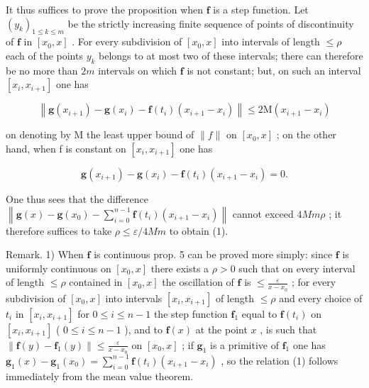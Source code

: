 It thus suffices to prove the proposition when \(\mathbf{f}\) is a step function. Let \((y_{k})_{1\leqslant k\leqslant m}\) be the strictly increasing finite sequence of points of discontinuity of \(\mathbf{f}\) in \([x_0, x]\) . For every subdivision of \([x_0, x]\) into intervals of length \(\leqslant \rho\) each of the points \(y_{k}\) belongs to at most two of these intervals; there can therefore be no more than \(2m\) intervals on which \(\mathbf{f}\) is not constant; but, on such an interval \([x_i, x_{i+1}]\) one has

\[
\left\| \mathbf {g} \left(x _ {i + 1}\right) - \mathbf {g} \left(x _ {i}\right) - \mathbf {f} \left(t _ {i}\right) \left(x _ {i + 1} - x _ {i}\right) \right\| \leqslant 2 \mathrm{M} \left(x _ {i + 1} - x _ {i}\right)
\]

on denoting by M the least upper bound of \(\|f\|\) on \([x_{0}, x]\) ; on the other hand, when f is constant on \([x_{i}, x_{i+1}]\) one has

\[
\mathbf {g} (x _ {i + 1}) - \mathbf {g} (x _ {i}) - \mathbf {f} (t _ {i}) (x _ {i + 1} - x _ {i}) = 0.
\]

One thus sees that the difference \(\left\|\mathbf{g}(x)-\mathbf{g}(x_{0})-\sum_{i=0}^{n-1}\mathbf{f}(t_{i})(x_{i+1}-x_{i})\right\|\) cannot exceed \(4Mm\rho\) ; it therefore suffices to take \(\rho\leqslant\varepsilon/4Mm\) to obtain (1).

Remark. 1) When \(\mathbf{f}\) is continuous prop. 5 can be proved more simply: since \(\mathbf{f}\) is uniformly continuous on \([x_0, x]\) there exists a \(\rho > 0\) such that on every interval of length \(\leqslant \rho\) contained in \([x_0, x]\) the oscillation of \(\mathbf{f}\) is \(\leqslant \frac{\varepsilon}{x - x_0}\) ; for every subdivision of \([x_0, x]\) into intervals \([x_i, x_{i+1}]\) of length \(\leqslant \rho\) and every choice of \(t_i\) in \([x_i, x_{i+1}]\) for \(0 \leqslant i \leqslant n-1\) the step function \(\mathbf{f}_1\) equal to \(\mathbf{f}(t_i)\) on \([x_i, x_{i+1}]\) ( \(0 \leqslant i \leqslant n-1\) ), and to \(\mathbf{f}(x)\) at the point \(x\) , is such that \(\| \mathbf{f}(y) - \mathbf{f}_1(y)\| \leqslant \frac{\varepsilon}{x - x_0}\) on \([x_0, x]\) ; if \(\mathbf{g}_1\) is a primitive of \(\mathbf{f}_1\) one has \(\mathbf{g}_1(x) - \mathbf{g}_1(x_0) = \sum_{i=0}^{n-1} \mathbf{f}(t_i)(x_{i+1} - x_i)\) , so the relation (1) follows immediately from the mean value theorem.

